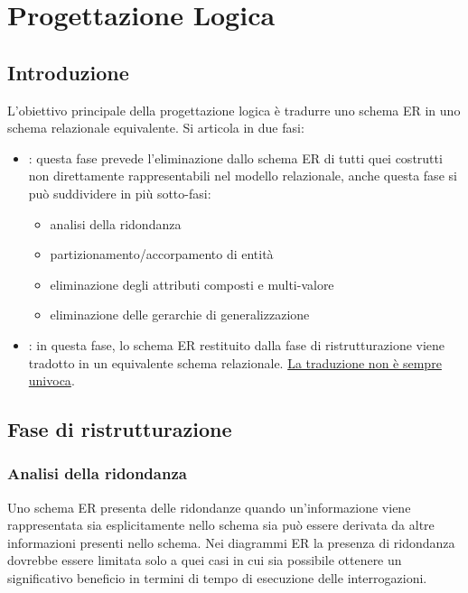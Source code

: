 \documentclass[12pt, a4paper]{report}
\begin{document}
    \chapter{Progettazione Logica}
    \section{Introduzione}
    L'obiettivo principale della progettazione logica è tradurre uno schema ER in uno schema relazionale equivalente. Si articola in due fasi:
    \begin{itemize}
        \item {}: questa fase prevede l'eliminazione dallo schema ER di tutti quei costrutti non direttamente rappresentabili nel modello relazionale, anche questa fase si può suddividere in più sotto-fasi:
        \begin{itemize}
            \item analisi della ridondanza
            \item partizionamento/accorpamento di entità
            \item eliminazione degli attributi composti e multi-valore
            \item eliminazione delle gerarchie di generalizzazione
        \end{itemize}
        \item {}: in questa fase, lo schema ER restituito dalla fase di ristrutturazione viene tradotto in un equivalente schema relazionale. \underline{La traduzione non è sempre univoca}.
    \end{itemize}
    \section{Fase di ristrutturazione}
    \subsection{Analisi della ridondanza}
    Uno schema ER presenta delle ridondanze quando un'informazione viene rappresentata sia esplicitamente nello schema sia può essere derivata da altre informazioni presenti nello schema. Nei diagrammi ER la presenza di ridondanza dovrebbe essere limitata solo a quei casi in cui sia possibile ottenere un significativo beneficio in termini di tempo di esecuzione delle interrogazioni.
\end{document}
